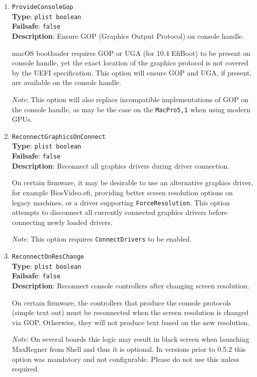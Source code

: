 \documentclass[]{article}
\begin{document}
\begin{enumerate}
\item
  \texttt{ProvideConsoleGop}\\
  \textbf{Type}: \texttt{plist\ boolean}\\
  \textbf{Failsafe}: \texttt{false}\\
  \textbf{Description}: Ensure GOP (Graphics Output Protocol) on console handle.

  macOS bootloader requires GOP or UGA (for 10.4 EfiBoot) to be present on console
  handle, yet the exact location of the graphics protocol is not covered by the
  UEFI specification. This option will ensure GOP and UGA, if present, are available
  on the console handle.

  \emph{Note}: This option will also replace incompatible implementations of GOP on the
  console handle, as may be the case on the \texttt{MacPro5,1} when using modern GPUs.

\item
  \texttt{ReconnectGraphicsOnConnect}\\
  \textbf{Type}: \texttt{plist\ boolean}\\
  \textbf{Failsafe}: \texttt{false}\\
  \textbf{Description}: Reconnect all graphics drivers during driver connection.

  On certain firmware, it may be desirable to use an alternative graphics driver,
  for example BiosVideo.efi, providing better screen resolution options on legacy
  machines, or a driver supporting \texttt{ForceResolution}. This option attempts
  to disconnect all currently connected graphics drivers before connecting newly
  loaded drivers.

  \emph{Note}: This option requires \texttt{ConnectDrivers} to be enabled.

\item
  \texttt{ReconnectOnResChange}\\
  \textbf{Type}: \texttt{plist\ boolean}\\
  \textbf{Failsafe}: \texttt{false}\\
  \textbf{Description}: Reconnect console controllers after changing screen resolution.

  On certain firmware, the controllers that produce the console protocols (simple text out)
  must be reconnected when the screen resolution is changed via GOP. Otherwise, they will
  not produce text based on the new resolution.

  \emph{Note}: On several boards this logic may result in black screen when launching
  MaxRegner from Shell and thus it is optional. In versions prior to 0.5.2 this option
  was mandatory and not configurable. Please do not use this unless required.


\end{enumerate}
\end{document}

